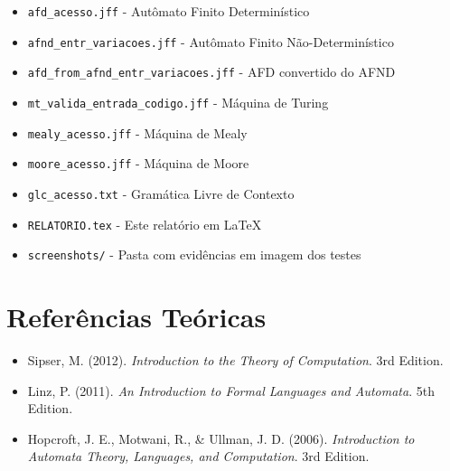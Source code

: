 \documentclass[12pt,a4paper]{article}
\begin{document}
\begin{itemize}
    \item \texttt{afd\_acesso.jff} - Autômato Finito Determinístico
    \item \texttt{afnd\_entr\_variacoes.jff} - Autômato Finito Não-Determinístico
    \item \texttt{afd\_from\_afnd\_entr\_variacoes.jff} - AFD convertido do AFND
    \item \texttt{mt\_valida\_entrada\_codigo.jff} - Máquina de Turing
    \item \texttt{mealy\_acesso.jff} - Máquina de Mealy
    \item \texttt{moore\_acesso.jff} - Máquina de Moore
    \item \texttt{glc\_acesso.txt} - Gramática Livre de Contexto
    \item \texttt{RELATORIO.tex} - Este relatório em LaTeX
    \item \texttt{screenshots/} - Pasta com evidências em imagem dos testes
\end{itemize}

\section{Referências Teóricas}

\begin{itemize}
    \item Sipser, M. (2012). \textit{Introduction to the Theory of Computation}. 3rd Edition.
    \item Linz, P. (2011). \textit{An Introduction to Formal Languages and Automata}. 5th Edition.
    \item Hopcroft, J. E., Motwani, R., \& Ullman, J. D. (2006). \textit{Introduction to Automata Theory, Languages, and Computation}. 3rd Edition.
\end{itemize}
\end{document}
